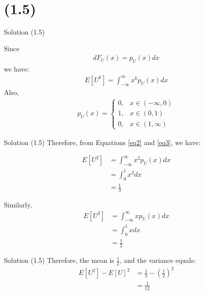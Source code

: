 \documentclass{beamer}
\providecommand{\brak}[1]{\ensuremath{\left(#1\right)}}
\begin{document}
\section{(1.5)}
\begin{frame}{Solution (1.5)}

    Since 
    \begin{align}
        dF_U(x) = p_U(x) dx
    \end{align}
    we have:
    \begin{align}
        \label{eq2}
        E[U^k] = \int_{-\infty}^{\infty}x^k p_U(x) dx
    \end{align}
    Also,
    \begin{align}
        \label{eq3}
         p_U(x) = 
        \begin{cases}
            0, & x \in (-\infty,0) \\
            1, & x \in (0,1) \\
            0, & x \in (1, \infty)
        \end{cases}
    \end{align}
    \end{frame}
    
    \begin{frame}{Solution (1.5) }
    Therefore, from Equations \ref{eq2} and \ref{eq3}, we have:
    
    \begin{align}
        E[U^2] &=  \int_{-\infty}^{\infty}x^2 p_U(x) dx \\
        &= \int_0 ^1 x^2 dx \\
        &= \frac{1}{3}
    \end{align}
    
    Similarly, 
    \begin{align}
        E[U^2] &=  \int_{-\infty}^{\infty}x p_U(x) dx \\
        &= \int_0 ^1 x dx \\
        &= \frac{1}{2}
    \end{align}
    \end{frame}
    
    \begin{frame}{Solution (1.5)}
    Therefore, the mean is $\frac{1}{2}$, and the variance equals:
    \begin{align}
        E[U^2] - E[U]^2 &= \frac{1}{3} - \brak{\frac{1}{2}}^2 \\
        &= \frac{1}{12}
    \end{align}
    
    
    \end{frame}
    
\end{document}
